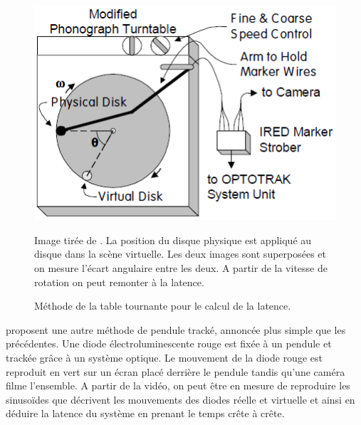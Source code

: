 	\begin{figure}[h]
		\centering
		\includegraphics[scale=.75]{Figures/SwindellsPhonograph}
		\caption{Méthode de la table tournante pour le calcul de la latence.}{Image tirée de \citep{swindells_system_2000}. La position du disque physique est appliqué au disque dans la scène virtuelle. Les deux images sont superposées et on mesure l'écart angulaire entre les deux. A partir de la vitesse de rotation on peut remonter à la latence.}
		\label{fig:swindells_phonograph}
	\end{figure}
	
	\par \citep{steed_simple_2008} proposent une autre méthode de pendule tracké, annoncée plus simple que les précédentes. Une diode électroluminescente rouge est fixée à un pendule et trackée grâce à un système optique. Le mouvement de la diode rouge est reproduit en vert sur un écran placé derrière le pendule tandis qu'une caméra filme l'ensemble. A partir de la vidéo, on peut être en mesure de reproduire les sinusoïdes que décrivent les mouvements des diodes réelle et virtuelle et ainsi en déduire la latence du système en prenant le temps crête à crête.
	
